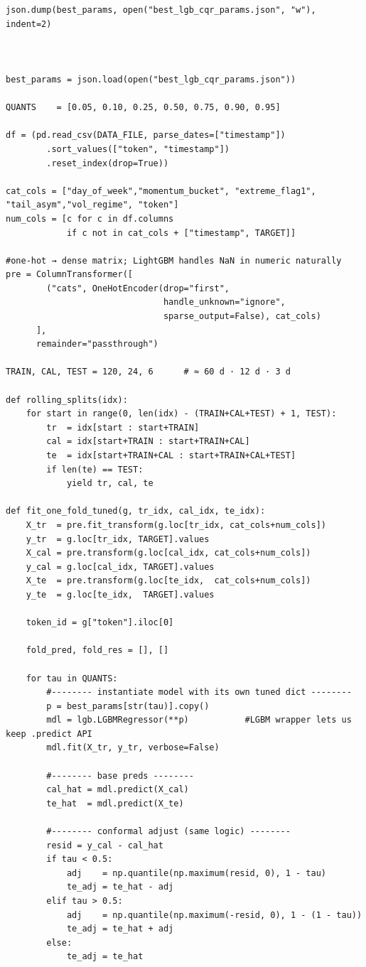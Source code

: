 \documentclass[
  a4paper,
  DIV=11,
  numbers=noendperiod]{scrreprt}
\begin{document}
\begin{verbatim}
json.dump(best_params, open("best_lgb_cqr_params.json", "w"), indent=2)



best_params = json.load(open("best_lgb_cqr_params.json"))

QUANTS    = [0.05, 0.10, 0.25, 0.50, 0.75, 0.90, 0.95]

df = (pd.read_csv(DATA_FILE, parse_dates=["timestamp"])
        .sort_values(["token", "timestamp"])
        .reset_index(drop=True))

cat_cols = ["day_of_week","momentum_bucket", "extreme_flag1", "tail_asym","vol_regime", "token"]
num_cols = [c for c in df.columns
            if c not in cat_cols + ["timestamp", TARGET]]

#one-hot → dense matrix; LightGBM handles NaN in numeric naturally
pre = ColumnTransformer([
        ("cats", OneHotEncoder(drop="first",
                               handle_unknown="ignore",
                               sparse_output=False), cat_cols)
      ],
      remainder="passthrough")

TRAIN, CAL, TEST = 120, 24, 6      # ≈ 60 d · 12 d · 3 d

def rolling_splits(idx):
    for start in range(0, len(idx) - (TRAIN+CAL+TEST) + 1, TEST):
        tr  = idx[start : start+TRAIN]
        cal = idx[start+TRAIN : start+TRAIN+CAL]
        te  = idx[start+TRAIN+CAL : start+TRAIN+CAL+TEST]
        if len(te) == TEST:
            yield tr, cal, te

def fit_one_fold_tuned(g, tr_idx, cal_idx, te_idx):
    X_tr  = pre.fit_transform(g.loc[tr_idx, cat_cols+num_cols])
    y_tr  = g.loc[tr_idx, TARGET].values
    X_cal = pre.transform(g.loc[cal_idx, cat_cols+num_cols])
    y_cal = g.loc[cal_idx, TARGET].values
    X_te  = pre.transform(g.loc[te_idx,  cat_cols+num_cols])
    y_te  = g.loc[te_idx,  TARGET].values

    token_id = g["token"].iloc[0]

    fold_pred, fold_res = [], []

    for tau in QUANTS:
        #-------- instantiate model with its own tuned dict --------
        p = best_params[str(tau)].copy()
        mdl = lgb.LGBMRegressor(**p)           #LGBM wrapper lets us keep .predict API
        mdl.fit(X_tr, y_tr, verbose=False)

        #-------- base preds --------
        cal_hat = mdl.predict(X_cal)
        te_hat  = mdl.predict(X_te)

        #-------- conformal adjust (same logic) --------
        resid = y_cal - cal_hat
        if tau < 0.5:
            adj    = np.quantile(np.maximum(resid, 0), 1 - tau)
            te_adj = te_hat - adj
        elif tau > 0.5:
            adj    = np.quantile(np.maximum(-resid, 0), 1 - (1 - tau))
            te_adj = te_hat + adj
        else:
            te_adj = te_hat


\end{verbatim}
\end{document}
